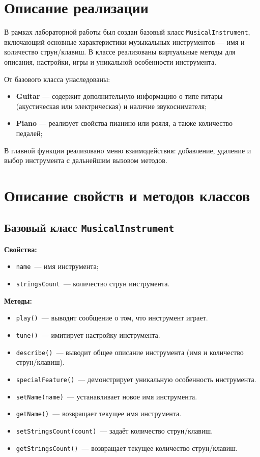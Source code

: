 \documentclass[14pt]{extarticle}
\begin{document}
\section{Описание реализации}
В рамках лабораторной работы был создан базовый класс \texttt{MusicalInstrument}, включающий основные характеристики музыкальных инструментов — имя и количество струн/клавиш. В классе реализованы виртуальные методы для описания, настройки, игры и уникальной особенности инструмента.

От базового класса унаследованы:
\begin{itemize}
    \item \textbf{Guitar} — содержит дополнительную информацию о типе гитары (акустическая или электрическая) и наличие звукоснимателя;
    \item \textbf{Piano} — реализует свойства пианино или рояля, а также количество педалей;
\end{itemize}

В главной функции реализовано меню взаимодействия: добавление, удаление и выбор инструмента с дальнейшим вызовом методов.

\newpage
\section{Описание свойств и методов классов}

\subsection*{Базовый класс \texttt{MusicalInstrument}}

\textbf{Свойства:}

\begin{itemize}
\item \texttt{name}~--- имя инструмента;
\item \texttt{stringsCount}~--- количество струн инструмента.
\end{itemize}

\textbf{Методы:}

\begin{itemize}
    \item \texttt{play()}~--- выводит сообщение о том, что инструмент играет.
    \item \texttt{tune()}~--- имитирует настройку инструмента.
    \item \texttt{describe()}~--- выводит общее описание инструмента (имя и количество струн/клавиш).
    \item \texttt{specialFeature()}~--- демонстрирует уникальную особенность инструмента.
    \item \texttt{setName(name)}~--- устанавливает новое имя инструмента.
    \item \texttt{getName()}~--- возвращает текущее имя инструмента.
    \item \texttt{setStringsCount(count)}~--- задаёт количество струн/клавиш.
    \item \texttt{getStringsCount()}~--- возвращает текущее количество струн/клавиш.
\end{itemize}
\end{document}
